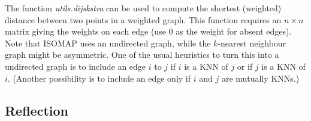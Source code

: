 \documentclass{article}
\begin{document}
The function \emph{utils.dijskstra} can be used to compute the shortest (weighted) distance between two points in a weighted graph. 
This function requires an $n \times n$ matrix giving the weights on each edge (use $0$ as the weight for absent edges). 
Note that ISOMAP uses an undirected graph, while the $k$-nearest neighbour graph might be asymmetric. 
One of the usual heuristics to turn this into a undirected graph is to include an edge $i$ to $j$ if $i$ is a KNN of $j$ or if $j$ is a KNN of $i$. 
(Another possibility is to include an edge only if $i$ and $j$ are mutually KNNs.)



\subsection{Reflection}

\end{document}
